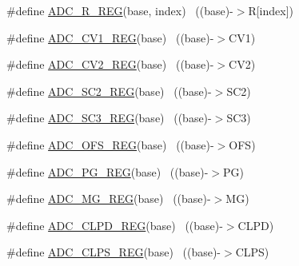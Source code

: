 \begin{DoxyCompactItemize}
\item 
\#define \hyperlink{group___a_d_c___register___accessor___macros_gaa73e4be773e5276ec891d3ae1cfd7944}{A\+D\+C\+\_\+\+R\+\_\+\+R\+EG}(base,  index)                                    ~((base)-\/$>$R\mbox{[}index\mbox{]})
\item 
\#define \hyperlink{group___a_d_c___register___accessor___macros_gaf1a44ade9e2d74c7a84112c805324a85}{A\+D\+C\+\_\+\+C\+V1\+\_\+\+R\+EG}(base)                                            ~((base)-\/$>$C\+V1)
\item 
\#define \hyperlink{group___a_d_c___register___accessor___macros_ga9f977af3e7e4f2a9840761e0b789edfa}{A\+D\+C\+\_\+\+C\+V2\+\_\+\+R\+EG}(base)                                            ~((base)-\/$>$C\+V2)
\item 
\#define \hyperlink{group___a_d_c___register___accessor___macros_ga59320fe45b43cd7adf0432961b7fd878}{A\+D\+C\+\_\+\+S\+C2\+\_\+\+R\+EG}(base)                                            ~((base)-\/$>$S\+C2)
\item 
\#define \hyperlink{group___a_d_c___register___accessor___macros_ga3ad2d8654c9403859753d71eb1ff0f6e}{A\+D\+C\+\_\+\+S\+C3\+\_\+\+R\+EG}(base)                                            ~((base)-\/$>$S\+C3)
\item 
\#define \hyperlink{group___a_d_c___register___accessor___macros_ga4b4fbf29b89f142f123aed9b97f55266}{A\+D\+C\+\_\+\+O\+F\+S\+\_\+\+R\+EG}(base)                                            ~((base)-\/$>$O\+FS)
\item 
\#define \hyperlink{group___a_d_c___register___accessor___macros_ga4d97338d7454f7bdaf0b5167c29729c3}{A\+D\+C\+\_\+\+P\+G\+\_\+\+R\+EG}(base)                                              ~((base)-\/$>$PG)
\item 
\#define \hyperlink{group___a_d_c___register___accessor___macros_ga92ad06b46539182e739c15a332939dbd}{A\+D\+C\+\_\+\+M\+G\+\_\+\+R\+EG}(base)                                              ~((base)-\/$>$MG)
\item 
\#define \hyperlink{group___a_d_c___register___accessor___macros_gabae1662b235397e7a388ff36e00f732e}{A\+D\+C\+\_\+\+C\+L\+P\+D\+\_\+\+R\+EG}(base)                                          ~((base)-\/$>$C\+L\+PD)
\item 
\#define \hyperlink{group___a_d_c___register___accessor___macros_ga482119bbb8a6c40285b6999d6a88d76a}{A\+D\+C\+\_\+\+C\+L\+P\+S\+\_\+\+R\+EG}(base)                                          ~((base)-\/$>$C\+L\+PS)
\item 

\end{DoxyCompactItemize}
